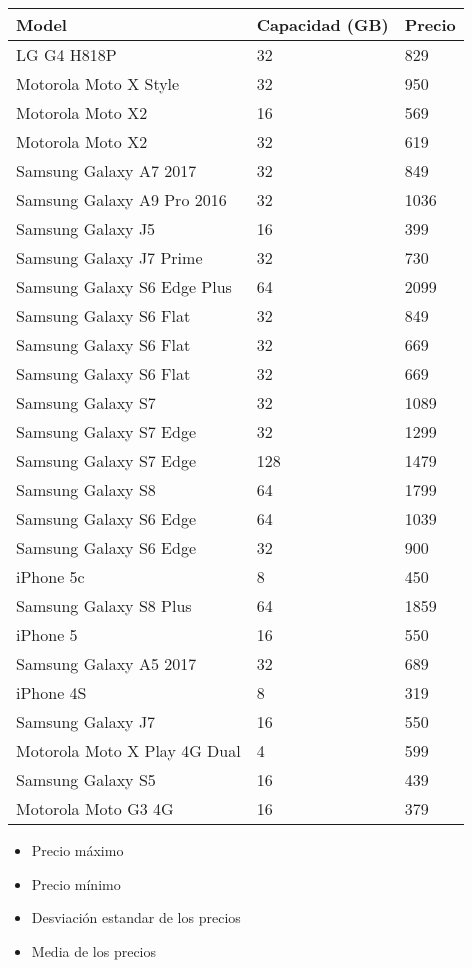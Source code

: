 \documentclass[a4paper ,12pt]{article}
\begin{document}
\begin{center}
	{\large 	
		\begin{tabular}{lll}
			\hline
			Model&Capacidad (GB)&Precio \\
			\hline
	
	LG G4 H818P&32&829 \\ 
	Motorola Moto X Style&32&950 \\
	Motorola Moto X2&16&569 \\
	Motorola Moto X2&32&619 \\
	Samsung Galaxy A7 2017&32&849 \\
	Samsung Galaxy A9 Pro 2016&32&1036 \\
	Samsung Galaxy J5&16&399 \\
	Samsung Galaxy J7 Prime&32&730 \\
	Samsung Galaxy S6 Edge Plus&64&2099 \\
	Samsung Galaxy S6 Flat&32&849 \\
	Samsung Galaxy S6 Flat&32&669 \\
	Samsung Galaxy S6 Flat&32&669 \\
	Samsung Galaxy S7&32&1089 \\
	Samsung Galaxy S7 Edge&32&1299 \\
	Samsung Galaxy S7 Edge&128&1479 \\
	Samsung Galaxy S8&64&1799 \\
	Samsung Galaxy S6 Edge&64&1039 \\
	Samsung Galaxy S6 Edge&32&900 \\
	iPhone 5c&8&450 \\
	Samsung Galaxy S8 Plus&64&1859  \\
	iPhone 5&16&550 \\
	Samsung Galaxy A5 2017&32&689 \\
	iPhone 4S&8&319 \\
	Samsung Galaxy J7&16&550 \\
	Motorola Moto X Play 4G Dual&4&599 \\
	Samsung Galaxy S5&16&439 \\
	Motorola Moto G3 4G&16&379 \\

		\hline
	\end{tabular}
}
\end{center}

\begin{itemize}
	\item Precio máximo
	\item Precio mínimo
	\item Desviación estandar de los precios
	\item Media de los precios
\end{itemize}
\end{document}
